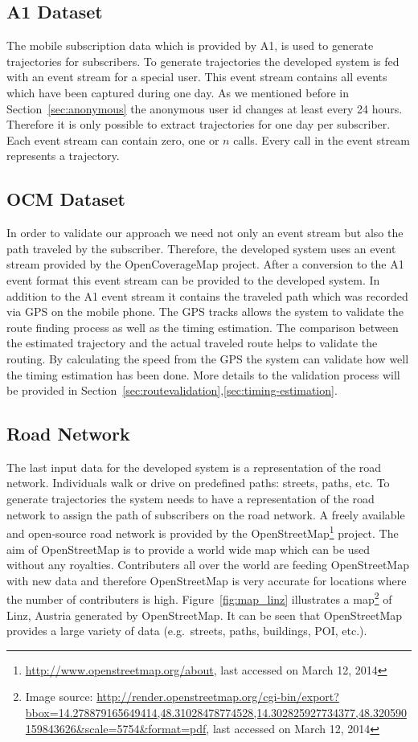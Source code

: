 \subsection{A1 Dataset}
The mobile subscription data which is provided by A1, is used to generate trajectories for subscribers. To generate trajectories the developed system is fed with an event stream for a special user. This event stream contains all events which have been captured during one day. As we mentioned before in Section~\ref{sec:anonymous} the anonymous user id changes at least every 24 hours. Therefore it is only possible to extract trajectories for one day per subscriber. Each event stream can contain zero, one or $n$ calls. Every call in the event stream represents a trajectory.
\subsection{OCM Dataset}
In order to validate our approach we need not only an event stream but also the path traveled by the subscriber. Therefore, the developed system uses an event stream provided by the OpenCoverageMap project. After a conversion to the A1 event format this event stream can be provided to the developed system. In addition to the A1 event stream it contains the traveled path which was recorded via GPS on the mobile phone. The GPS tracks allows the system to validate the route finding process as well as the timing estimation. The comparison between the estimated trajectory and the actual traveled route helps to validate the routing. By calculating the speed from the GPS the system can validate how well the timing estimation has been done. More details to the validation process will be provided in Section~\ref{sec:routevalidation},\ref{sec:timing-estimation}.
\subsection{Road Network}
The last input data for the developed system is a representation of the road network. Individuals walk or drive on predefined paths: streets, paths, etc. To generate trajectories the system needs to have a representation of the road network to assign the path of subscribers on the road network. A freely available and open-source road network is provided by the OpenStreetMap\footnote{\url{http://www.openstreetmap.org/about}, last accessed on March 12, 2014} project. The aim of OpenStreetMap is to provide a world wide map which can be used without any royalties. Contributers all over the world are feeding OpenStreetMap with new data and therefore OpenStreetMap is very accurate for locations where the number of contributers is high. Figure~\ref{fig:map_linz} illustrates a map\footnote{Image source: \url{http://render.openstreetmap.org/cgi-bin/export?bbox=14.278879165649414,48.31028478774528,14.302825927734377,48.320590159843626&scale=5754&format=pdf}, last accessed on March 12, 2014} of Linz, Austria generated by OpenStreetMap. It can be seen that OpenStreetMap provides a large variety of data (e.g.\ streets, paths, buildings, POI, etc.).

